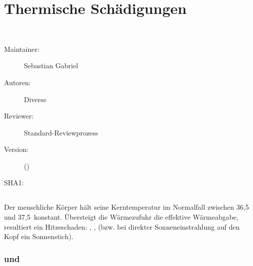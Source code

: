 \def\ChapterCode{THE}
\chapter
[\CO{[THE]} Thermische Schädigungen]
{Thermische Schädigungen}
\label{chp:THE}

\ChapterIntro
{%
~~~
}
{%
\begin{description}
  \item[Maintainer:] Sebastian Gabriel
  \item[Autoren:] Diverse
  \item[Reviewer:] Standard-Reviewprozess
  \item[Version:] {\VarDocVersionTypeName} ({\VarDocVersionTypeDescription})
  \item[SHA1:] {\DocGitCommit}
\end{description}

{\TxTeilkapitelAASS}
}

\clearpage
\section{}

\Text
{{\TxBeschreibung}}%
{%
\label{topic:Hitzeerkrankungen}%
\label{topic:system-Hitzeschaeden}%
Der menschliche Körper hält seine Kerntemperatur  im
Normalfall zwischen 36,5 und 37,5{\,\DegC}  konstant.
Übersteigt  die Wärmezufuhr die effektive  Wärmeabgabe,
resultiert ein Hitzeschaden:  ,
 , 
 (bzw. bei  direkter Sonneneinstrahlung auf den Kopf ein
 Sonnen\-stich).
}%




\subsection{ und 
}
\label{topic:hitzekollaps}
\label{topic:hitzeerschoepfung}

